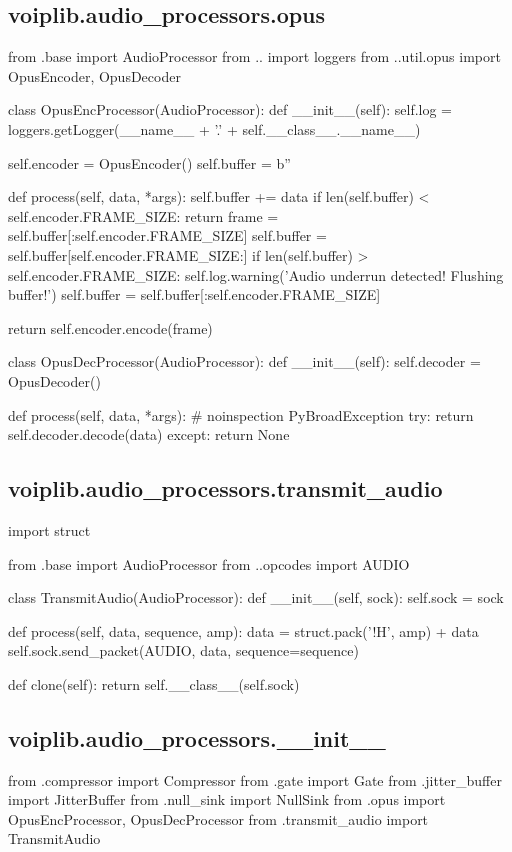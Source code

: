 \subsection{voiplib.audio\_processors.opus}
\begin{pythoncode}
from .base import AudioProcessor
from .. import loggers
from ..util.opus import OpusEncoder, OpusDecoder


class OpusEncProcessor(AudioProcessor):
    def __init__(self):
        self.log = loggers.getLogger(__name__ + '.' + self.__class__.__name__)

        self.encoder = OpusEncoder()
        self.buffer = b''

    def process(self, data, *args):
        self.buffer += data
        if len(self.buffer) < self.encoder.FRAME_SIZE:
            return
        frame = self.buffer[:self.encoder.FRAME_SIZE]
        self.buffer = self.buffer[self.encoder.FRAME_SIZE:]
        if len(self.buffer) > self.encoder.FRAME_SIZE:
            self.log.warning('Audio underrun detected! Flushing buffer!')
            self.buffer = self.buffer[:self.encoder.FRAME_SIZE]

        return self.encoder.encode(frame)


class OpusDecProcessor(AudioProcessor):
    def __init__(self):
        self.decoder = OpusDecoder()

    def process(self, data, *args):
        # noinspection PyBroadException
        try:
            return self.decoder.decode(data)
        except:
            return None
\end{pythoncode}
\subsection{voiplib.audio\_processors.transmit\_audio}
\begin{pythoncode}
import struct

from .base import AudioProcessor
from ..opcodes import AUDIO


class TransmitAudio(AudioProcessor):
    def __init__(self, sock):
        self.sock = sock

    def process(self, data, sequence, amp):
        data = struct.pack('!H', amp) + data
        self.sock.send_packet(AUDIO, data, sequence=sequence)

    def clone(self):
        return self.__class__(self.sock)

\end{pythoncode}
\subsection{voiplib.audio\_processors.\_\_init\_\_}
\begin{pythoncode}
from .compressor import Compressor
from .gate import Gate
from .jitter_buffer import JitterBuffer
from .null_sink import NullSink
from .opus import OpusEncProcessor, OpusDecProcessor
from .transmit_audio import TransmitAudio
\end{pythoncode}
